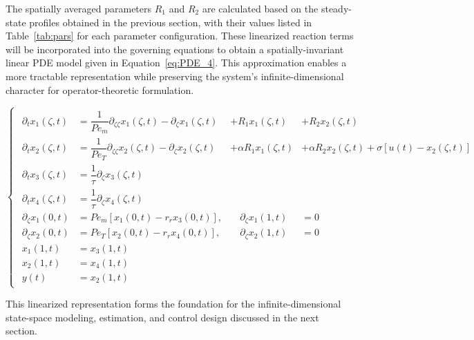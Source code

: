 The spatially averaged parameters $R_1$ and $R_2$ are calculated based on the steady-state profiles obtained in the previous section, with their values listed in Table~\ref{tab:pars} for each parameter configuration. These linearized reaction terms will be incorporated into the governing equations to obtain a spatially-invariant linear PDE model given in Equation~\eqref{eq:PDE_4}. This approximation enables a more tractable representation while preserving the system's infinite-dimensional character for operator-theoretic formulation.

\begin{equation} \label{eq:PDE_4}
\begin{cases}
\begin{alignedat}{3}
    \partial_{t} x_1(\zeta, t) &= \dfrac{1}{Pe_m} \partial_{\zeta\zeta} x_1(\zeta, t) 
    - \partial_{\zeta} x_1(\zeta, t) 
    &+ R_1 x_1(\zeta, t) &+ R_2 x_2(\zeta, t) \\[2.0ex]

    \partial_{t} x_2(\zeta, t) &= \dfrac{1}{Pe_T} \partial_{\zeta\zeta} x_2(\zeta, t) 
    - \partial_{\zeta} x_2(\zeta, t)
    &+ \alpha R_1 x_1(\zeta, t)  &+ \alpha R_2 x_2(\zeta, t) + \sigma \left[ u(t) - x_2(\zeta, t) \right] \\[2.0ex]

    \partial_{t} x_3(\zeta, t) &= \dfrac{1}{\tau} \partial_{\zeta} x_3(\zeta, t) 
    &\quad & \\[2.0ex]

    \partial_{t} x_4(\zeta, t) &= \dfrac{1}{\tau} \partial_{\zeta} x_4(\zeta, t) 
    &\quad & \\[3.0ex]

    \partial_\zeta x_1(0, t) &= Pe_m \left[ x_1(0, t) - r_r x_3(0, t) \right], 
    &\quad \partial_{\zeta} x_1(1, t) &= 0 \\[1.5ex]

    \partial_\zeta x_2(0, t) &= Pe_T \left[ x_2(0, t) - r_r x_4(0, t) \right], 
    &\quad \partial_{\zeta} x_2(1, t) &= 0 \\[1.5ex]

    x_1(1, t) &= x_3(1, t) \\[1.5ex]
    x_2(1, t) &= x_4(1, t) \\[1.5ex]
    y(t) &= x_2(1, t)
\end{alignedat}
\end{cases}
\end{equation}

This linearized representation forms the foundation for the infinite-dimensional state-space modeling, estimation, and control design discussed in the next section.